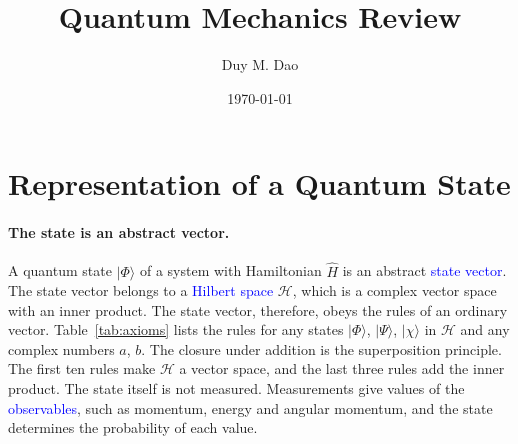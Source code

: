 \documentclass[11pt]{article}      %
\title{Quantum Mechanics Review}
\author{Duy M. Dao}
\date{\today}                      %
\numberwithin{equation}{section}   %
\begin{document}
\maketitle                         %

\newpage

\section{Representation of a Quantum State}

\paragraph{The state is an abstract vector.} A quantum state $|\Phi\rangle$ of a system with Hamiltonian $\hat H$ is an abstract \textcolor{blue}{state vector}. The state vector belongs to a \textcolor{blue}{Hilbert space} $\mathcal{H}$, which is a complex vector space with an inner product. The state vector, therefore, obeys the rules of an ordinary vector. Table~\ref{tab:axioms} lists the rules for any states $|\Phi\rangle$, $|\Psi\rangle$, $|\chi\rangle$ in $\mathcal{H}$ and any complex numbers $a$, $b$. The closure under addition is the superposition principle. The first ten rules make $\mathcal{H}$ a vector space, and the last three rules add the inner product.
The state itself is not measured. Measurements give values of the \textcolor{blue}{observables}, such as momentum, energy and angular momentum, and the state determines the probability of each value.
\end{document}
